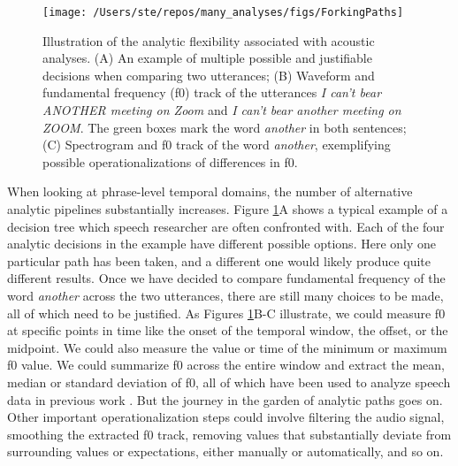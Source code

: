 \documentclass[Review,times,sageh]{sagej}
\begin{document}
\begin{figure}
\texttt{[image: /Users/ste/repos/many\_analyses/figs/ForkingPaths]} \caption{Illustration of the analytic flexibility associated with acoustic analyses. (A) An example of multiple possible and justifiable decisions when comparing two utterances; (B) Waveform and fundamental frequency (f0) track of the utterances \emph{I can't bear ANOTHER meeting on Zoom} and \emph{I can't bear another meeting on ZOOM}. The green boxes mark the word \emph{another} in both sentences; (C) Spectrogram and f0 track of the word \emph{another}, exemplifying possible operationalizations of differences in f0.}\label{fig:forkingPaths}
\end{figure}

When looking at phrase-level temporal domains, the number of alternative analytic pipelines substantially increases.
Figure \ref{fig:forkingPaths}A shows a typical example of a decision tree which speech researcher are often confronted with.
Each of the four analytic decisions in the example have different possible options.
Here only one particular path has been taken, and a different one would likely produce quite different results.
Once we have decided to compare fundamental frequency of the word \emph{another} across the two utterances, there are still many choices to be made, all of which need to be justified.
As Figures \ref{fig:forkingPaths}B-C illustrate, we could measure f0 at specific points in time like the onset of the temporal window, the offset, or the midpoint.
We could also measure the value or time of the minimum or maximum f0 value.
We could summarize f0 across the entire window and extract the mean, median or standard deviation of f0, all of which have been used to analyze speech data in previous work \citep[see][]{gordon2017acoustic}.
But the journey in the garden of analytic paths goes on.
Other important operationalization steps could involve filtering the audio signal, smoothing the extracted f0 track, removing values that substantially deviate from surrounding values or expectations, either manually or automatically, and so on.
\end{document}
